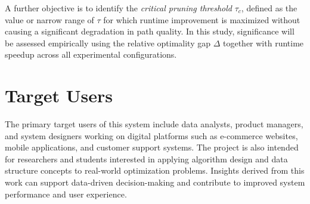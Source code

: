 A further objective is to identify the \emph{critical pruning threshold} $\tau_c$, defined as the value or narrow range of $\tau$ for which runtime improvement is maximized without causing a significant degradation in path quality. In this study, significance will be assessed empirically using the relative optimality gap $\Delta$ together with runtime speedup across all experimental configurations.

\section{Target Users}

The primary target users of this system include data analysts, product managers, and system designers working on digital platforms such as e-commerce websites, mobile applications, and customer support systems. The project is also intended for researchers and students interested in applying algorithm design and data structure concepts to real-world optimization problems. Insights derived from this work can support data-driven decision-making and contribute to improved system performance and user experience.
